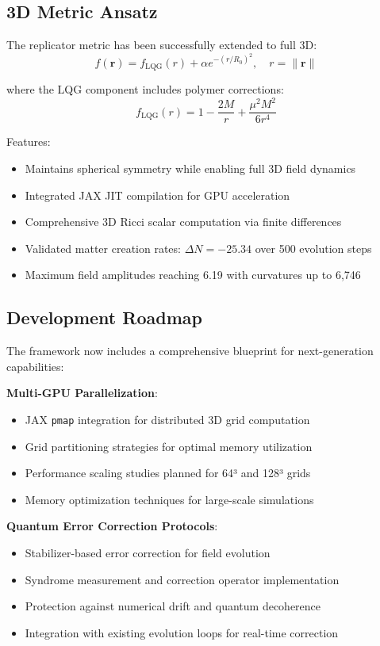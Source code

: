 \documentclass[11pt]{article}
\begin{document}
\subsection{3D Metric Ansatz}

The replicator metric has been successfully extended to full 3D:
\begin{equation}
f(\mathbf{r}) = f_{\text{LQG}}(r) + \alpha e^{-(r/R_0)^2}, \quad r = \|\mathbf{r}\|
\end{equation}

where the LQG component includes polymer corrections:
\begin{equation}
f_{\text{LQG}}(r) = 1 - \frac{2M}{r} + \frac{\mu^2 M^2}{6r^4}
\end{equation}

Features:
\begin{itemize}
\item Maintains spherical symmetry while enabling full 3D field dynamics
\item Integrated JAX JIT compilation for GPU acceleration
\item Comprehensive 3D Ricci scalar computation via finite differences
\item Validated matter creation rates: $\Delta N = -25.34$ over 500 evolution steps
\item Maximum field amplitudes reaching 6.19 with curvatures up to 6,746
\end{itemize}

\subsection{Development Roadmap}

The framework now includes a comprehensive blueprint for next-generation capabilities:

\textbf{Multi-GPU Parallelization}:
\begin{itemize}
\item JAX \texttt{pmap} integration for distributed 3D grid computation
\item Grid partitioning strategies for optimal memory utilization
\item Performance scaling studies planned for 64³ and 128³ grids
\item Memory optimization techniques for large-scale simulations
\end{itemize}

\textbf{Quantum Error Correction Protocols}:
\begin{itemize}
\item Stabilizer-based error correction for field evolution
\item Syndrome measurement and correction operator implementation
\item Protection against numerical drift and quantum decoherence
\item Integration with existing evolution loops for real-time correction
\end{itemize}
\end{document}
